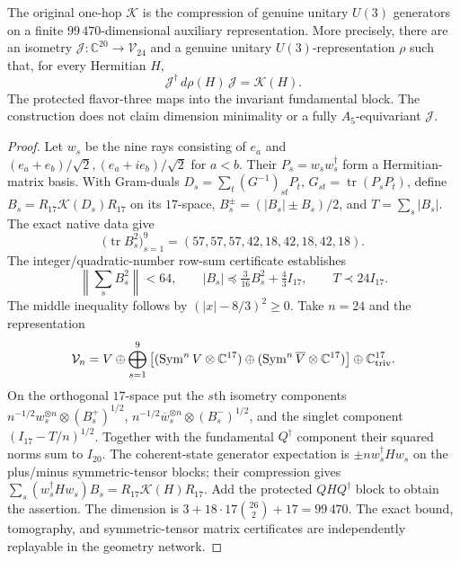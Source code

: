 \documentclass[11pt]{article}
\begin{document}
\begin{theorem}
\label{p1b:thm:fullcarrier-finite-exact-current-dilation}
The original one-hop $\mathscr K$ is the compression of genuine
unitary $U(3)$ generators on a finite $99\,470$-dimensional auxiliary
representation.  More precisely, there are an isometry
$\mathcal J:\mathbb C^{20}\to\mathcal V_{24}$ and a genuine unitary
$U(3)$-representation $\rho$ such that, for every Hermitian $H$,
\[
 \boxed{\mathcal J^\dagger\,d\rho(H)\,\mathcal J=\mathscr K(H).}
\]
The protected flavor-three maps into the invariant fundamental block.
The construction does not claim dimension minimality or a fully
$A_5$-equivariant $\mathcal J$.
\end{theorem}
\begin{proof}
Let $w_s$ be the nine rays consisting of $e_a$ and
$(e_a+e_b)/\sqrt2,(e_a+ie_b)/\sqrt2$ for $a<b$.
Their $P_s=w_sw_s^\dagger$ form a Hermitian-matrix basis.
With Gram-duals $D_s=\sum_t(G^{-1})_{st}P_t$,
$G_{st}=\operatorname{tr}(P_sP_t)$, define
$B_s=R_{17}\mathscr K(D_s)R_{17}$ on its $17$-space,
$B_s^{\pm}=(|B_s|\pm B_s)/2$, and $T=\sum_s|B_s|$.
The exact native data give
\[
 \bigl(\operatorname{tr}B_s^2\bigr)_{s=1}^{9}
 =(57,57,57,42,18,42,18,42,18).
\]
The integer/quadratic-number row-sum certificate establishes
\[
 \left\|\sum_s B_s^2\right\|<64,
 \qquad |B_s|\preceq\tfrac3{16}B_s^2+\tfrac43 I_{17},
 \qquad T\prec24I_{17}.
\]
The middle inequality follows by $(|x|-8/3)^2\ge0$.
Take $n=24$ and the representation
\[
 \mathcal V_n=V\oplus\bigoplus_{s=1}^{9}
 \left[(\operatorname{Sym}^nV\otimes\mathbb C^{17})
 \oplus(\operatorname{Sym}^n\overline V\otimes\mathbb C^{17})\right]
 \oplus\mathbb C^{17}_{\rm triv}.
\]
On the orthogonal $17$-space put the $s$th isometry components
$n^{-1/2}w_s^{\otimes n}\otimes(B_s^+)^{1/2}$,
$n^{-1/2}\overline w_s^{\otimes n}\otimes(B_s^-)^{1/2}$,
and the singlet component $(I_{17}-T/n)^{1/2}$.
Together with the fundamental $Q^\dagger$ component their squared
norms sum to $I_{20}$.  The coherent-state generator expectation is
$\pm n w_s^\dagger H w_s$ on the plus/minus symmetric-tensor
blocks; their compression gives
$\sum_s(w_s^\dagger Hw_s)B_s=R_{17}\mathscr K(H)R_{17}$.
Add the protected $QHQ^\dagger$ block to obtain the assertion.
The dimension is $3+18\cdot17\binom{26}{2}+17=99\,470$.
The exact bound, tomography, and symmetric-tensor matrix certificates
are independently replayable in the geometry network.
\end{proof}
\end{document}
